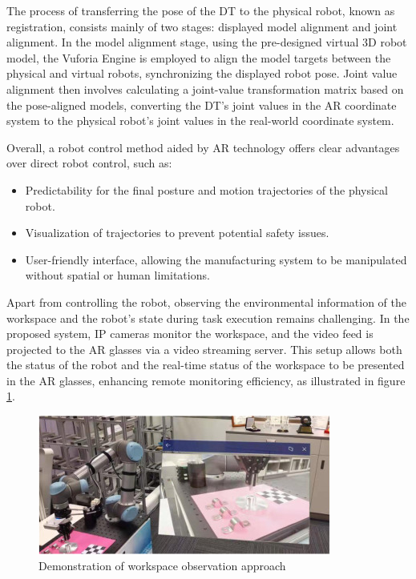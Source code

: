 \begin{enumerate}
    The process of transferring the pose of the \ac{DT} to the physical robot, known as registration, consists mainly of two stages: displayed model alignment and joint alignment. In the model alignment stage, using the pre-designed virtual 3D robot model, the Vuforia Engine is employed to align the model targets between the physical and virtual robots, synchronizing the displayed robot pose. Joint value alignment then involves calculating a joint-value transformation matrix based on the pose-aligned models, converting the \ac{DT}'s joint values in the \ac{AR} coordinate system to the physical robot's joint values in the real-world coordinate system.


    Overall, a robot control method aided by \ac{AR} technology offers clear advantages over direct robot control, such as:
    \begin{itemize}
        \item Predictability for the final posture and motion trajectories of the physical robot.
        \item Visualization of trajectories to prevent potential safety issues.
        \item User-friendly interface, allowing the manufacturing system to be manipulated without spatial or human limitations.
    \end{itemize}

    Apart from controlling the robot, observing the environmental information of the workspace and the robot's state during task execution remains challenging. In the proposed system, IP cameras monitor the workspace, and the video feed is projected to the \ac{AR} glasses via a video streaming server. This setup allows both the status of the robot and the real-time status of the workspace to be presented in the \ac{AR} glasses, enhancing remote monitoring efficiency, as illustrated in figure \ref{f:workspace-visualization}.

    \begin{figure}[!htpb]
        \centering
        \includegraphics[width=0.7\linewidth]{figs/workspace-visualization.jpg}
        \caption{Demonstration of workspace observation approach \cite{LI2022102321}}
        \label{f:workspace-visualization}   
    \end{figure}
    \FloatBarrier


\end{enumerate}
